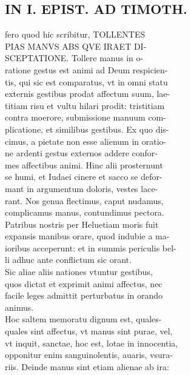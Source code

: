 \documentclass{article}
\begin{document}
\begin{pages}
\section*{IN I. EPIST. AD TIMOTH. \\
                }
fero quod hic scribitur, TOLLENTES \\
                PIAS MANVS ABS QVE IRAET DI- \\
                SCEPTATIONE. Tollere manus in o- \\
                ratione gestus est animi ad Deum respicien- \\
                tis, qui sic est comparatus, vt in omni statu \\
                externis gestibus prodat affectum suum, lae- \\
                titiam risu et vultu hilari prodit: tristitiam \\
                contra moerore, submissione manuum com- \\
                plicatione, et similibus gestibus. Ex quo dis- \\
                cimus, a pietate non esse alienum in oratio- \\
                ne ardenti gestus externos addere confor- \\
                mes affectibus animi. Hinc alii prosternunt \\
                se humi, et Iudaei cinere et sacco se defor- \\
                mant in argumentum doloris, vestes lace- \\
                rant. Nos genua flectimus, caput nudamus, \\
                complicamus manus, contundimus pectora. \\
                Patribus nostris per Heluetiam moris fuit \\
                expansis manibus orare, quod indubie a ma- \\
                ioribus acceperunt: et in summis periculis bel- \\
                li adhuc ante conflictum sic orant. \\
                Sic aliae aliis nationes vtuntur gestibus, \\
                quos dictat et exprimit animi affectus, nec \\
                facile leges admittit perturbatus in orando \\
                animus. \\
                Hoc saltem memoratu dignum est, quales- \\
                quales sint affectus, vt manus sint purae, vel, \\
                vt inquit, sanctae, hoc est, lotae in innocentia, \\
                opponitur enim sanguinolentis, auaris, vsura- \\
                riis. Deinde manus sint etiam alienae ab ira: \\
                

\end{pages}
\end{document}
